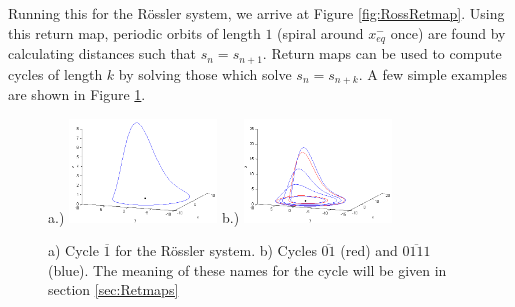 \documentclass[aip,cha,reprint,
secnumarabic,
nofootinbib, tightenlines,
nobibnotes, showkeys, showpacs,
groupedaddress
]{revtex4-1}
\begin{document}
Running this for the R\"ossler system, we arrive at Figure \ref{fig:RossRetmap}.  Using this return map, periodic orbits of length $1$ (spiral around $x_{eq}^{-}$ once) are found by calculating distances such that $s_n = s_{n+1}$.  Return maps can be used to compute cycles of length $k$ by solving those which solve $s_n = s_{n+k}$.  A few simple examples are shown in Figure \ref{fig:RossPO}.

\begin{figure}[h]
\centering
a.)  \includegraphics[width=0.35\textwidth]{Figs/Section1/kcross1cyclec.png}
b.)
  \includegraphics[width=0.35\textwidth]{Figs/Section1/kcross24cyclesc.png}
\caption{a) Cycle $\overline{1}$ for the R\"ossler system. b) Cycles $\overline{01}$ (red) and $\overline{0111}$ (blue).  The meaning of these names for the cycle will be given in section \ref{sec:Retmaps}}
 \label{fig:RossPO}
\end{figure}
\end{document}
